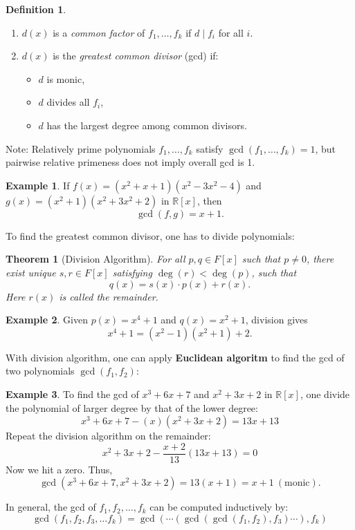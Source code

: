 \documentclass[11pt,openany]{book}
\theoremstyle{plain}
\newtheorem{theorem}{Theorem}[chapter]
\theoremstyle{definition}
\newtheorem{definition}[definition]{Definition}
\newtheorem{example}[example]{Example}
\theoremstyle{remark}
\begin{document}
\begin{definition}  
\begin{enumerate}
    \item $d(x)$ is a \textit{common factor} of $f_1, \dots, f_k$ if $d \mid f_i$ for all $i$.
    \item $d(x)$ is the \textit{greatest common divisor} (gcd) if:
    \begin{itemize}
        \item $d$ is monic,
        \item $d$ divides all $f_i$,
        \item $d$ has the largest degree among common divisors.
    \end{itemize}
\end{enumerate}
\end{definition}
Note: Relatively prime polynomials $f_1, \dots, f_k$ satisfy $\gcd(f_1,\dots,f_k) = 1$, but pairwise relative primeness does not imply overall gcd is 1.


\begin{example}  
If $f(x) = (x^2 + x + 1)(x^2 - 3x^2 - 4)$ and $g(x) = (x^2 + 1)(x^2 + 3x^2 + 2)$ in $\mathbb{R}[x]$, then
\[
    \gcd(f,g) = x +1.
\]
\end{example}

To find the greatest common divisor, one has to divide polynomials:
\begin{theorem} [Division Algorithm] 
For all $p,q \in F[x]$ such that $p \neq 0$, there exist unique $s,r \in F[x]$ satisfying $\deg(r) < \deg(p)$, such that
\[
    q(x) = s(x) \cdot p(x) + r(x).
\]
Here $r(x)$ is called the \textit{remainder}.
\end{theorem}

\begin{example}  
Given $p(x) = x^4 + 1$ and $q(x) = x^2 + 1$, division gives
\[
    x^4 + 1 = (x^2 - 1)(x^2 + 1) + 2.
\]
\end{example}

With division algorithm, one can apply {\bf Euclidean algoritm} to find the gcd of two polynomials $\gcd(f_1, f_2)$:

\begin{example} To find the gcd of $x^3 + 6x + 7$ and $x^2 + 3x + 2$ in $\mathbb{R}[x]$, one divide the polynomial of larger degree by that of the lower degree:
\[
    x^3 + 6x + 7 - (x)(x^2 + 3x + 2) = 13x + 13
\]
Repeat the division algorithm on the remainder:
\[
    x^2 + 3x + 2 - \frac{x+2}{13}(13x+13) = 0
\]
Now we hit a zero. Thus,
\[
    \gcd(x^3 + 6x + 7, x^2 + 3x + 2) = 13(x+1) = x + 1 \ (\text{monic}).
\]
\end{example}
In general, the gcd of $f_1, f_2, \dots, f_k$ can be computed inductively by:
$$\gcd(f_1, f_2, f_3, \dots f_k) = \gcd(\cdots(\gcd(\gcd(f_1,f_2),f_3)\cdots),f_k) $$
\end{document}
